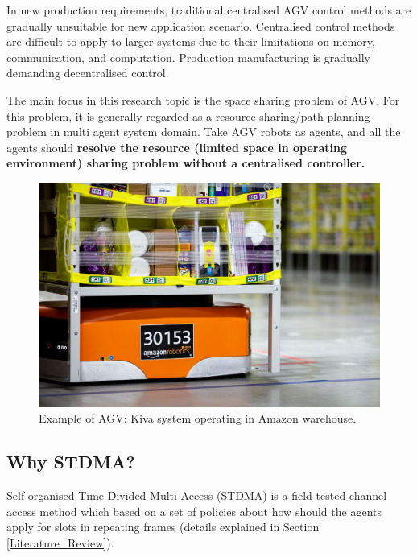 \documentclass[12pt, oneside]{article}
\begin{document}

In new production requirements, traditional centralised AGV control methods are gradually unsuitable for new application scenario. Centralised control methods are difficult to apply to larger systems due to their limitations on memory, communication, and computation. Production manufacturing is gradually demanding decentralised control\cite{Industry4.0_decentralised}.


    The main focus in this research topic is the space sharing problem of AGV. For this problem, it is generally regarded as a resource sharing/path planning problem in multi agent system domain\cite{AGV_Review_2020}. Take AGV robots as agents, and all the agents should \textbf{resolve the resource (limited space in operating environment) sharing problem without a centralised controller.}

\begin{figure}
    \centering
    \includegraphics[width=0.6\linewidth]{figs/Amazon_Warehouse.jpeg}
    \caption{Example of AGV: Kiva system operating in Amazon warehouse.\footnotemark }
    \label{fig:Amazon Warehouse Robots}
\end{figure}


\subsection{Why STDMA?}

Self-organised Time Divided Multi Access (STDMA) is a field-tested \cite{STDMA_field_usage} channel access method which based on a set of policies about how  should the agents apply for slots in repeating frames (details explained in Section \ref{Literature_Review}). 
\end{document}
